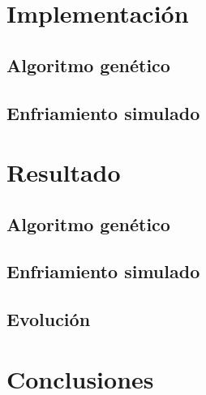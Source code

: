 \documentclass[11pt,spanish,listoffigures,listoftables]{tfgetsinf}
\begin{document}
\chapter{Implementación}


\section{Algoritmo genético}

\section{Enfriamiento simulado}


\chapter{Resultado}

\section{Algoritmo genético}

\section{Enfriamiento simulado}

\section{Evolución}


\chapter{Conclusiones}

\cleardoublepage
\printbibliography
\end{document}
